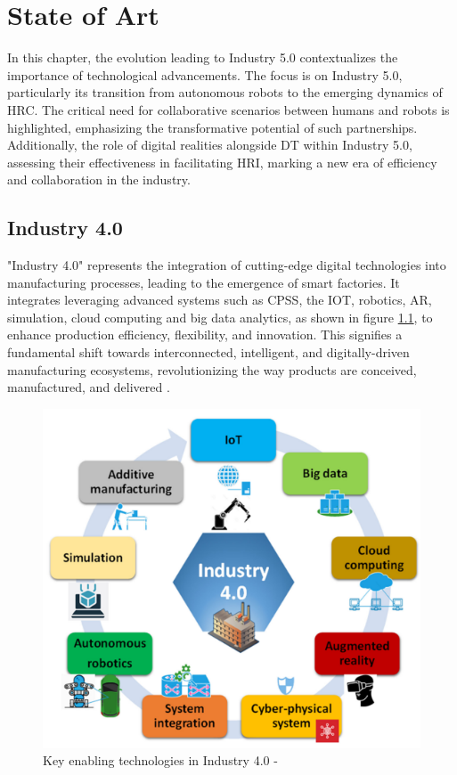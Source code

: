 \chapter{State of Art}%
\label{chapter:stateofart}


\begin{introduction}
In this chapter, the evolution leading to Industry 5.0 contextualizes the importance of technological advancements. 
The focus is on Industry 5.0, particularly its transition from autonomous robots to the emerging dynamics of \ac{HRC}.
The critical need for collaborative scenarios between humans and robots is highlighted, emphasizing the transformative potential of such partnerships. 
Additionally, the role of digital realities alongside \ac{DT} within Industry 5.0, assessing their effectiveness in facilitating \ac{HRI}, marking a new era of efficiency and collaboration in the industry.
\end{introduction}


\section{Industry 4.0}
\label{section:industry-4}
"Industry 4.0" represents the integration of cutting-edge digital technologies into manufacturing processes, leading to the emergence of smart factories. 
It integrates leveraging advanced systems such as \ac{CPSS}, the \ac{IOT}, robotics, \ac{AR}, simulation, cloud computing and big data analytics,
as shown in figure \ref{fig:key-tech-industry-4}, to enhance production efficiency, flexibility, and innovation. This signifies a fundamental 
shift towards interconnected, intelligent, and digitally-driven manufacturing ecosystems, revolutionizing the way products are conceived, manufactured, 
and delivered \cite{Moller2022,Ahmed2022}.

\begin{figure}[htbp]
    \centering
    \includegraphics[width=0.6\linewidth]{figs/key-tech-industry-4.png}
    \caption{Key enabling technologies in Industry 4.0 - \cite{Ahmed2022}}
    \label{fig:key-tech-industry-4}
\end{figure}


